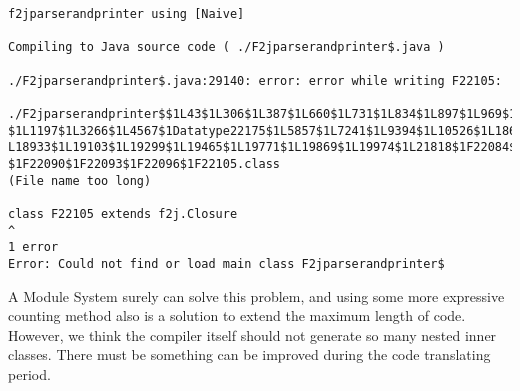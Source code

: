\begin{itemize}
\begin{lstlisting}
f2jparserandprinter using [Naive]

Compiling to Java source code ( ./F2jparserandprinter$.java )

./F2jparserandprinter$.java:29140: error: error while writing F22105:

./F2jparserandprinter$$1L43$1L306$1L387$1L660$1L731$1L834$1L897$1L969$1L1050
$1L1197$1L3266$1L4567$1Datatype22175$1L5857$1L7241$1L9394$1L10526$1L18657$1
L18933$1L19103$1L19299$1L19465$1L19771$1L19869$1L19974$1L21818$1F22084$1F22087
$1F22090$1F22093$1F22096$1F22105.class
(File name too long)

class F22105 extends f2j.Closure
^
1 error
Error: Could not find or load main class F2jparserandprinter$
\end{lstlisting} 

A Module System surely can solve this problem, and using some more expressive counting method also is a solution to extend the maximum length of code. However, we think the compiler itself should not generate so many nested inner classes. There must be something can be improved during the code translating period.

\end{itemize}